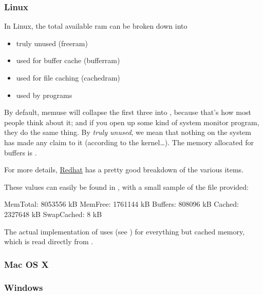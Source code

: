 \subsubsection{Linux}
In Linux, the total available ram can be broken down into
\begin{itemize}
  \item truly unused (freeram)
  \item used for buffer cache (bufferram)
  \item used for file caching (cachedram)
  \item used by programs
\end{itemize}

By default, memuse will collapse the first three into , because that's how most people think about it; and if you open up some kind of system monitor program, they do the same thing.  By \emph{truly unused}, we mean that nothing on the system has made any claim to it (according to the kernel\dots).  The memory allocated for buffers is .

For more details, \href{https://www.redhat.com/advice/tips/meminfo.html}{Redhat} has a pretty good breakdown of the various items.


These values can easily be found in , with a small sample of the file provided:

\begin{center}
\begin{minipage}{.4\textwidth}
\begin{Output}
MemTotal:        8053556 kB
MemFree:         1761144 kB
Buffers:          808096 kB
Cached:          2327648 kB
SwapCached:            8 kB
\end{Output}
\end{minipage}
\end{center}

The actual implementation of  uses  (see ) for everything but cached memory, which is read directly from .





\subsubsection{Mac OS X}






\subsubsection{Windows}

